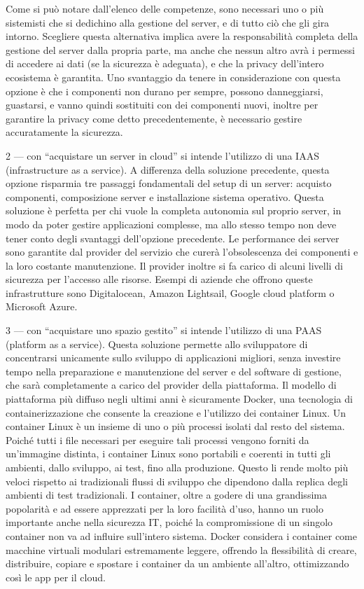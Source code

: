 \documentclass[12pt,a4paper]{article}
\begin{document}
Come si può notare dall’elenco delle competenze, sono necessari uno o più sistemisti che si dedichino alla gestione del server, e di tutto ciò che gli gira intorno.
Scegliere questa alternativa implica avere la responsabilità completa della gestione del server dalla propria parte, ma anche che nessun altro avrà i permessi di accedere ai dati (se la sicurezza è adeguata), e che la privacy dell’intero ecosistema è garantita. Uno svantaggio da tenere in considerazione con questa opzione è che i componenti non durano per sempre, possono danneggiarsi, guastarsi, e vanno quindi sostituiti con dei componenti nuovi, inoltre per garantire la privacy come detto precedentemente, è necessario gestire accuratamente la sicurezza.

2 --- con “acquistare un server in cloud” si intende l’utilizzo di una IAAS (infrastructure as a service). A differenza della soluzione precedente, questa opzione risparmia tre passaggi fondamentali del setup di un server: acquisto componenti, composizione server e installazione sistema operativo.
Questa soluzione è perfetta per chi vuole la completa autonomia sul proprio server, in modo da poter gestire applicazioni complesse, ma allo stesso tempo non deve tener conto degli svantaggi dell’opzione precedente. Le performance dei server sono garantite dal provider del servizio che curerà l’obsolescenza dei componenti e la loro costante manutenzione. Il provider inoltre si fa carico di alcuni livelli di sicurezza per l’accesso alle risorse. Esempi di aziende che offrono queste infrastrutture sono Digitalocean, Amazon Lightsail, Google cloud platform o Microsoft Azure.

3 –-- con “acquistare uno spazio gestito” si intende l’utilizzo di una PAAS (platform as a service). Questa soluzione permette allo sviluppatore di concentrarsi unicamente sullo sviluppo di applicazioni migliori, senza investire tempo nella preparazione e manutenzione del server e del software di gestione, che sarà completamente a carico del provider della piattaforma.
Il modello di piattaforma più diffuso negli ultimi anni è sicuramente Docker, una tecnologia di containerizzazione che consente la creazione e l'utilizzo dei container Linux.
Un container Linux è un insieme di uno o più processi isolati dal resto del sistema. Poiché tutti i file necessari per eseguire tali processi vengono forniti da un'immagine distinta, i container Linux sono portabili e coerenti in tutti gli ambienti, dallo sviluppo, ai test, fino alla produzione. Questo li rende molto più veloci rispetto ai tradizionali flussi di sviluppo che dipendono dalla replica degli ambienti di test tradizionali. I container, oltre a godere di una grandissima popolarità e ad essere apprezzati per la loro facilità d'uso, hanno un ruolo importante anche nella sicurezza IT, poiché la compromissione di un singolo container non va ad influire sull’intero sistema.
Docker considera i container come macchine virtuali modulari estremamente leggere, offrendo la flessibilità di creare, distribuire, copiare e spostare i container da un ambiente all'altro, ottimizzando così le app per il cloud.
\end{document}
